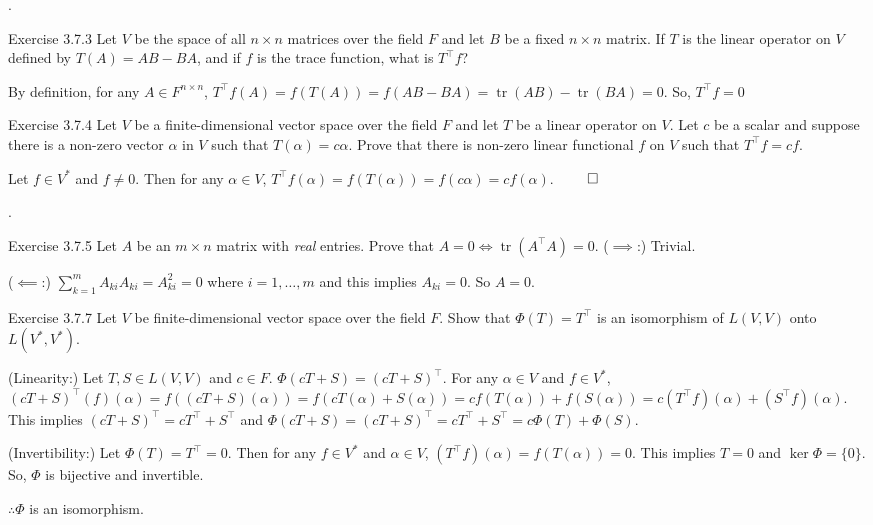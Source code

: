 \documentclass[8pt]{beamer}
\newcommand{\ti}[1]{\textit{#1}}
\newcommand{\tr}{\operatorname{tr}}
\begin{document}
\begin{frame}{.}
    \begin{block}{Exercise 3.7.3}
        Let $V$ be the space of all $n \times n$ matrices over the field $F$ and let $B$ be a fixed $n \times n$ matrix.
        If $T$ is the linear operator on $V$ defined by $T(A) = AB - BA$, and if $f$ is the trace function, what is $T^\top f$?

        \smallskip
        By definition, for any $A \in F^{n \times n}$, $T^\top f (A) = f(T(A)) = f(AB-BA) = \tr(AB) -\tr(BA) = 0$.
        So, $T^\top f = 0$
    \end{block}

    \begin{block}{Exercise 3.7.4}
        Let $V$ be a finite-dimensional vector space over the field $F$ and let $T$ be a linear operator on $V$.
        Let $c$ be a scalar and suppose there is a non-zero vector $\alpha$ in $V$ such that $T(\alpha) = c\alpha$.
        Prove that there is non-zero linear functional $f$ on $V$ such that $T^\top f = cf$.

        \smallskip
        Let $f \in V^\ast$ and $f \neq 0$. Then for any $\alpha \in V$, $T^\top f(\alpha) = f(T(\alpha)) = f(c\alpha) = cf(\alpha)$.
        $\qed$
    \end{block}
\end{frame}

\begin{frame}{.}
    \begin{block}{Exercise 3.7.5}
        Let $A$ be an $m \times n$ matrix with \ti{real} entries.
        Prove that $A =0 \iff \tr(A^\top A) = 0$.
        ($\implies$:) Trivial.

        ($\impliedby$:) $\sum_{k=1}^m A_{ki} A_{ki} = A_{ki}^2 = 0$ where $i=1, \dots, m$ and this implies $A_{ki} = 0$.
        So $A =0$.
    \end{block}

    \begin{block}{Exercise 3.7.7}
        Let $V$ be finite-dimensional vector space over the field $F$.
        Show that $\Phi(T) = T^\top$ is an isomorphism of $L(V,V)$ onto $L(V^\ast, V^\ast)$.

        \smallskip
        (Linearity:) Let $T,S \in L(V,V)$ and $c \in F$.
        $\Phi(cT +S) = (cT + S)^\top$.
        For any $\alpha \in V$ and $f \in V^\ast$, $(cT + S)^\top (f) (\alpha) = f((cT + S)(\alpha)) = f(cT(\alpha) + S(\alpha)) = cf(T(\alpha)) + f(S(\alpha)) = c(T^\top f) (\alpha) + (S^\top f)(\alpha)$.
        This implies $(cT + S)^{\top} = cT^\top + S^\top$ and $\Phi(cT + S) = (cT + S)^\top = c T^\top + S^\top = c\Phi(T) + \Phi(S)$.

        \smallskip
        (Invertibility:) Let $\Phi(T) = T^\top = 0$. Then for any $f \in V^\ast$ and $\alpha \in V$, $(T^\top f) (\alpha) = f(T(\alpha)) =0$.
        This implies $T = 0$ and $\ker \Phi = \{0\}$.
        So, $\Phi$ is bijective and invertible.

        \smallskip
        $\therefore \Phi$ is an isomorphism.
    \end{block}
\end{frame}
\end{document}
